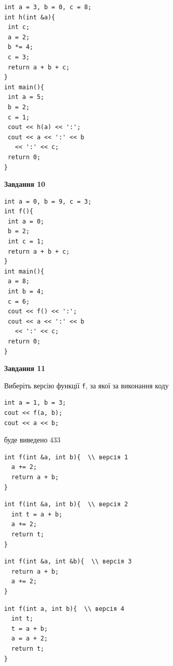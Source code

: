 \documentclass[12pt, ukrainian]{article}
\def\code#1{\Verb!#1!}
\begin{document}
{\begin {large}
\begin{minipage}[t]{7.0cm}
\begin{verbatim}
int a = 3, b = 0, c = 8;
int h(int &a){
 int c;
 a = 2;
 b *= 4;
 c = 3;
 return a + b + c;
}
int main(){
 int a = 5;
 b = 2;
 c = 1;
 cout << h(a) << ':';
 cout << a << ':' << b 
   << ':' << c;
 return 0;
}
\end{verbatim}



\begin{center}
\textbf{Завдання 10}
\end{center}
\vspace{-8mm}

\begin{verbatim}
int a = 0, b = 9, c = 3;
int f(){
 int a = 0;
 b = 2;
 int c = 1;
 return a + b + c;
}
int main(){
 a = 8;
 int b = 4;
 c = 6;
 cout << f() << ':';
 cout << a << ':' << b 
   << ':' << c;
 return 0;
}
\end{verbatim}

\end{minipage}
\vline \hspace{1mm}
\begin{minipage}[t]{11.0cm}

\begin{center}
\textbf{Завдання 11}
\end{center}
Виберіть версію функції \code{f}, за якої за виконання коду
\begin{verbatim}
int a = 1, b = 3;
cout << f(a, b);
cout << a << b;
\end{verbatim}

буде виведено 433

\begin{verbatim}
int f(int &a, int b){  \\ версія 1
  a += 2;
  return a + b;
}
\end{verbatim}

\vspace{-8mm}\begin{verbatim}
int f(int &a, int b){  \\ версія 2
  int t = a + b;
  a += 2;
  return t;
}
\end{verbatim}

\vspace{-8mm}\begin{verbatim}
int f(int &a, int &b){  \\ версія 3
  return a + b;
  a += 2;
}
\end{verbatim}

\vspace{-8mm}\begin{verbatim}
int f(int a, int b){  \\ версія 4
  int t;
  t = a + b;
  a = a + 2;
  return t;
}
\end{verbatim}




\end{minipage}
\end{large}}
\end{document}
